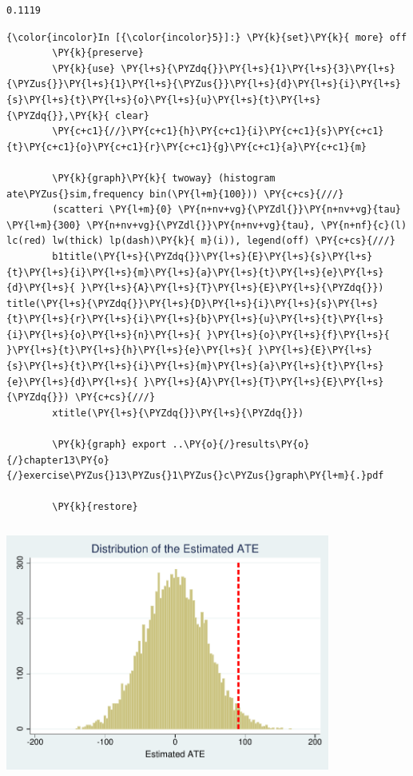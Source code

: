 \documentclass[11pt,notitlepage]{article}\usepackage[]{graphicx}\usepackage[]{color}
\makeatletter
\newenvironment{kframe}{%
 \def\at@end@of@kframe{}%
 \ifinner\ifhmode%
  \def\at@end@of@kframe{\end{minipage}}%
  \begin{minipage}{\columnwidth}%
 \fi\fi%
 \def\FrameCommand##1{\hskip\@totalleftmargin \hskip-\fboxsep
 \colorbox{shadecolor}{##1}\hskip-\fboxsep
     \hskip-\linewidth \hskip-\@totalleftmargin \hskip\columnwidth}%
 \MakeFramed {\advance\hsize-\width
   \@totalleftmargin\z@ \linewidth\hsize
   \@setminipage}}%
 {\par\unskip\endMakeFramed%
 \at@end@of@kframe}
\newenvironment{knitrout}{}{} %
\makeatother
\begin{document}
\begin{enumerate}[a)]
\begin{knitrout}
\begin{kframe}
    \begin{Verbatim}[commandchars=\\\{\}]
  0.1119

    \end{Verbatim}

    \begin{Verbatim}[commandchars=\\\{\}]
{\color{incolor}In [{\color{incolor}5}]:} \PY{k}{set}\PY{k}{ more} off
        \PY{k}{preserve}
        \PY{k}{use} \PY{l+s}{\PYZdq{}}\PY{l+s}{1}\PY{l+s}{3}\PY{l+s}{\PYZus{}}\PY{l+s}{1}\PY{l+s}{\PYZus{}}\PY{l+s}{d}\PY{l+s}{i}\PY{l+s}{s}\PY{l+s}{t}\PY{l+s}{o}\PY{l+s}{u}\PY{l+s}{t}\PY{l+s}{\PYZdq{}},\PY{k}{ clear}
        \PY{c+c1}{//}\PY{c+c1}{h}\PY{c+c1}{i}\PY{c+c1}{s}\PY{c+c1}{t}\PY{c+c1}{o}\PY{c+c1}{r}\PY{c+c1}{g}\PY{c+c1}{a}\PY{c+c1}{m}
        
        \PY{k}{graph}\PY{k}{ twoway} (histogram ate\PYZus{}sim,frequency bin(\PY{l+m}{100})) \PY{c+cs}{///}
        (scatteri \PY{l+m}{0} \PY{n+nv+vg}{\PYZdl{}}\PY{n+nv+vg}{tau} \PY{l+m}{300} \PY{n+nv+vg}{\PYZdl{}}\PY{n+nv+vg}{tau}, \PY{n+nf}{c}(l) lc(red) lw(thick) lp(dash)\PY{k}{ m}(i)), legend(off) \PY{c+cs}{///}
        b1title(\PY{l+s}{\PYZdq{}}\PY{l+s}{E}\PY{l+s}{s}\PY{l+s}{t}\PY{l+s}{i}\PY{l+s}{m}\PY{l+s}{a}\PY{l+s}{t}\PY{l+s}{e}\PY{l+s}{d}\PY{l+s}{ }\PY{l+s}{A}\PY{l+s}{T}\PY{l+s}{E}\PY{l+s}{\PYZdq{}}) title(\PY{l+s}{\PYZdq{}}\PY{l+s}{D}\PY{l+s}{i}\PY{l+s}{s}\PY{l+s}{t}\PY{l+s}{r}\PY{l+s}{i}\PY{l+s}{b}\PY{l+s}{u}\PY{l+s}{t}\PY{l+s}{i}\PY{l+s}{o}\PY{l+s}{n}\PY{l+s}{ }\PY{l+s}{o}\PY{l+s}{f}\PY{l+s}{ }\PY{l+s}{t}\PY{l+s}{h}\PY{l+s}{e}\PY{l+s}{ }\PY{l+s}{E}\PY{l+s}{s}\PY{l+s}{t}\PY{l+s}{i}\PY{l+s}{m}\PY{l+s}{a}\PY{l+s}{t}\PY{l+s}{e}\PY{l+s}{d}\PY{l+s}{ }\PY{l+s}{A}\PY{l+s}{T}\PY{l+s}{E}\PY{l+s}{\PYZdq{}}) \PY{c+cs}{///}
        xtitle(\PY{l+s}{\PYZdq{}}\PY{l+s}{\PYZdq{}}) 
        
        \PY{k}{graph} export ..\PY{o}{/}results\PY{o}{/}chapter13\PY{o}{/}exercise\PYZus{}13\PYZus{}1\PYZus{}c\PYZus{}graph\PY{l+m}{.}pdf	
        
        \PY{k}{restore}
\end{Verbatim}
\end{kframe}

{\centering \includegraphics[width=4.2in,height=3.3in]{figure/PS13-unnamed-chunk-3-1} 

}
\end{knitrout}
\end{enumerate}
\end{document}
